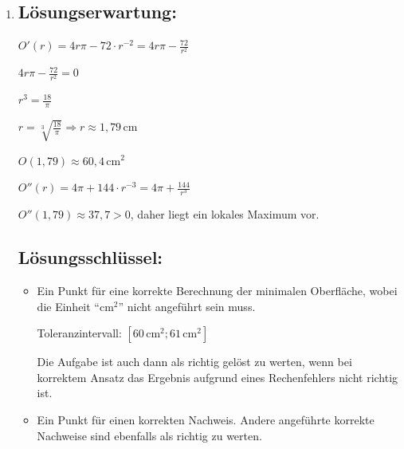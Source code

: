 \begin{langesbeispiel}
{\begin{enumerate}
\begin{itemize}
		Toleranzintervall für den unteren Wert: $[0,017; 0,02]$ 
		
		Toleranzintervall für den oberen Wert: $[0,042; 0,05]$ 
		
		Die Aufgabe ist auch dann als richtig gelöst zu werten, wenn bei korrektem Ansatz das Ergebnis aufgrund eines Rechenfehlers nicht richtig ist. 
		\item Ein Punkt für eine (sinngemäß) korrekte Angabe der entsprechenden Änderung. Andere angeführte korrekte Maßnahmen sind ebenfalls als richtig zu werten.
	\end{itemize}
	
	\item \subsection{Lösungserwartung:}
			
			$O'(r)=4r\pi-72\cdot r^{-2}=4r\pi-\frac{72}{r^2}$
	
	$4r\pi-\frac{72}{r^2}=0$
	
	$r^3=\frac{18}{\pi}$
	
	$r=\sqrt[3]{\frac{18}{\pi}} \Rightarrow r\approx 1,79$\,cm
	
	$O(1,79)\approx 60,4$\,cm$^2$
	
	$O''(r)=4\pi+144\cdot r^{-3}=4\pi+\frac{144}{r^3}$
	
	$O''(1,79)\approx 37,7>0$, daher liegt ein lokales Maximum vor.

	\subsection{Lösungsschlüssel:}
	
\begin{itemize}
	\item    Ein Punkt für eine korrekte Berechnung der minimalen Oberfläche, wobei die Einheit "`cm$^2$"' nicht angeführt sein muss. 
	
	Toleranzintervall: $[60\,\text{cm}^2; 61\,\text{cm}^2] $ 
	
	Die Aufgabe ist auch dann als richtig gelöst zu werten, wenn bei korrektem Ansatz das Ergebnis aufgrund eines Rechenfehlers nicht richtig ist. 
	\item  Ein Punkt für einen korrekten Nachweis. Andere angeführte korrekte Nachweise sind ebenfalls als richtig zu werten. 
\end{itemize}

\end{enumerate}}
		\end{langesbeispiel}